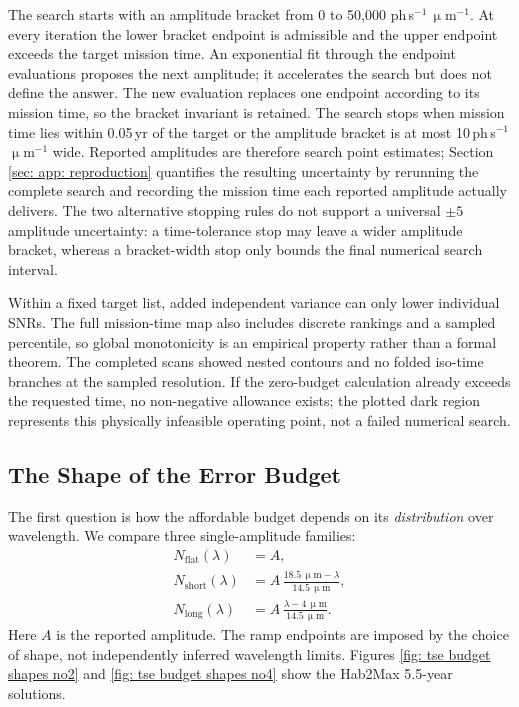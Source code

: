 \documentclass[12pt,a4paper]{article}
\numberwithin{equation}{section}
\numberwithin{figure}{section}
\numberwithin{table}{section}
\begin{document}
The search starts with an amplitude bracket from 0 to 50,000 ph\,s$^{-1}$\,$\upmu$m$^{-1}$. At every iteration the lower bracket endpoint is admissible and the upper endpoint exceeds the target mission time. An exponential fit through the endpoint evaluations proposes the next amplitude; it accelerates the search but does not define the answer. The new evaluation replaces one endpoint according to its mission time, so the bracket invariant is retained. The search stops when mission time lies within 0.05\,yr of the target or the amplitude bracket is at most 10\,ph\,s$^{-1}$\,$\upmu$m$^{-1}$ wide. Reported amplitudes are therefore search point estimates; Section \ref{sec: app: reproduction} quantifies the resulting uncertainty by rerunning the complete search and recording the mission time each reported amplitude actually delivers. The two alternative stopping rules do not support a universal $\pm5$ amplitude uncertainty: a time-tolerance stop may leave a wider amplitude bracket, whereas a bracket-width stop only bounds the final numerical search interval.

Within a fixed target list, added independent variance can only lower individual SNRs. The full mission-time map also includes discrete rankings and a sampled percentile, so global monotonicity is an empirical property rather than a formal theorem. The completed scans showed nested contours and no folded iso-time branches at the sampled resolution. If the zero-budget calculation already exceeds the requested time, no non-negative allowance exists; the plotted dark region represents this physically infeasible operating point, not a failed numerical search.

\subsection{The Shape of the Error Budget} \label{sec: tse: budget shape}
The first question is how the affordable budget depends on its \textit{distribution} over wavelength. We compare three single-amplitude families:
\begin{align}
N_\mathrm{flat}(\lambda)&=A,\\
N_\mathrm{short}(\lambda)&=A\,\frac{18.5\,\upmu\mathrm{m}-\lambda}{14.5\,\upmu\mathrm{m}},\\
N_\mathrm{long}(\lambda)&=A\,\frac{\lambda-4\,\upmu\mathrm{m}}{14.5\,\upmu\mathrm{m}}.
\end{align}
Here $A$ is the reported amplitude. The ramp endpoints are imposed by the choice of shape, not independently inferred wavelength limits. Figures \ref{fig: tse budget shapes no2} and \ref{fig: tse budget shapes no4} show the Hab2Max 5.5-year solutions.
\end{document}

